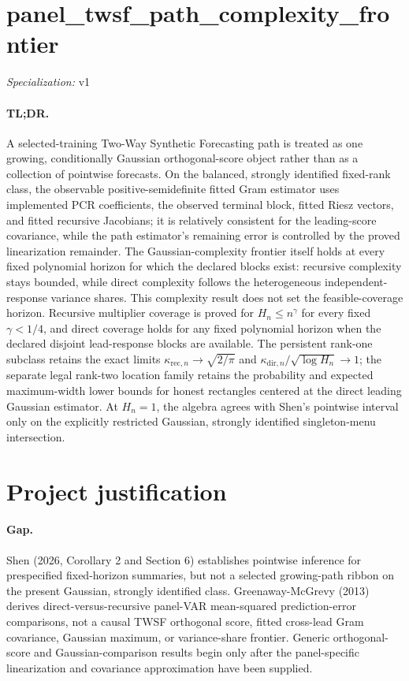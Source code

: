 \documentclass{article}
\begin{document}
\sloppy

\section*{panel\_\allowbreak{}twsf\_\allowbreak{}path\_\allowbreak{}complexity\_\allowbreak{}frontier}

\noindent\textit{Specialization:} v1\par

\paragraph{TL;DR.} A selected-training Two-Way Synthetic Forecasting path is treated as one growing, conditionally Gaussian orthogonal-score object rather than as a collection of pointwise forecasts. On the balanced, strongly identified fixed-rank class, the observable positive-semidefinite fitted Gram estimator uses implemented PCR coefficients, the observed terminal block, fitted Riesz vectors, and fitted recursive Jacobians; it is relatively consistent for the leading-score covariance, while the path estimator's remaining error is controlled by the proved linearization remainder. The Gaussian-complexity frontier itself holds at every fixed polynomial horizon for which the declared blocks exist: recursive complexity stays bounded, while direct complexity follows the heterogeneous independent-response variance shares. This complexity result does not set the feasible-coverage horizon. Recursive multiplier coverage is proved for \(H_n\le n^\gamma\) for every fixed \(\gamma<1/4\), and direct coverage holds for any fixed polynomial horizon when the declared disjoint lead-response blocks are available. The persistent rank-one subclass retains the exact limits \(\kappa_{\mathrm{rec},n}\to\sqrt{2/\pi}\) and \(\kappa_{\mathrm{dir},n}/\sqrt{\log H_n}\to1\); the separate legal rank-two location family retains the probability and expected maximum-width lower bounds for honest rectangles centered at the direct leading Gaussian estimator. At \(H_n=1\), the algebra agrees with Shen's pointwise interval only on the explicitly restricted Gaussian, strongly identified singleton-menu intersection.

\section{Project justification}

\paragraph{Gap.} Shen (2026, Corollary 2 and Section 6) establishes pointwise inference for prespecified fixed-horizon summaries, but not a selected growing-path ribbon on the present Gaussian, strongly identified class. Greenaway-McGrevy (2013) derives direct-versus-recursive panel-VAR mean-squared prediction-error comparisons, not a causal TWSF orthogonal score, fitted cross-lead Gram covariance, Gaussian maximum, or variance-share frontier. Generic orthogonal-score and Gaussian-comparison results begin only after the panel-specific linearization and covariance approximation have been supplied.
\end{document}
